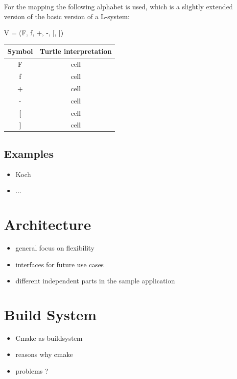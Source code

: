 \documentclass[english]{cpp-hmwk}
\begin{document}
\noindent For the mapping the following alphabet is used, which is a slightly extended version of the basic version of a L-system:

\begin{center}
V = (F, f, +, -, [,  ])
\end{center}


\begin{center}
\begin{tabular}{ c c }
Symbol & Turtle interpretation \\
\hline
F & cell  \\ 
f & cell  \\  
+& cell  \\  
-& cell  \\  
{[} & cell  \\  
{]} & cell \\

\end{tabular}
\end{center}

\bigskip




\subsection{Examples}

\begin{itemize}
	\item Koch
	\item ...
\end{itemize}
  
  


  
\pagebreak
\section{Architecture}
\begin{itemize}
	\item general focus on flexibility
	\item interfaces for future use cases
	\item different independent parts in the sample application
\end{itemize}

\section{Build System}
\begin{itemize}
	\item Cmake as buildsystem
	\item reasons why cmake
	\item problems ?
\end{itemize}
\end{document}

